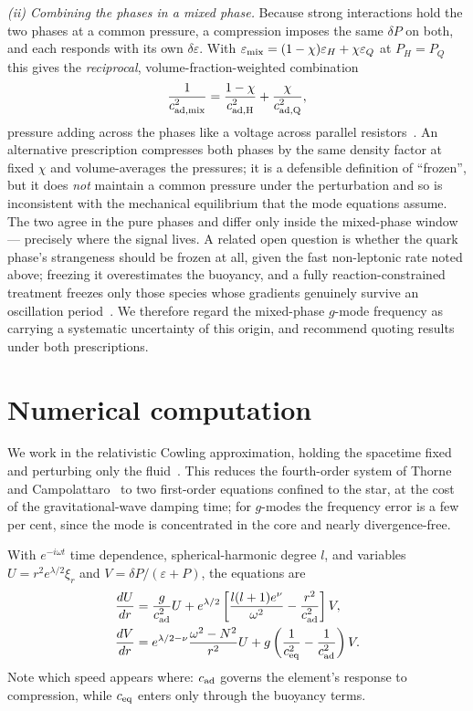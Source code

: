 \documentclass[aps,prd,twocolumn,superscriptaddress,nofootinbib,10pt]{revtex4-2}
\begin{document}
\emph{(ii) Combining the phases in a mixed phase.} Because strong interactions
hold the two phases at a common pressure, a compression imposes the same $\delta
P$ on both, and each responds with its own $\delta\varepsilon$. With
$\varepsilon_{\rm mix}=(1-\chi)\varepsilon_{H}+\chi\varepsilon_{Q}$ at
$P_{H}=P_{Q}$ this gives the \emph{reciprocal}, volume-fraction-weighted
combination
\begin{equation}
  \frac{1}{c_{\rm ad,mix}^{2}} = \frac{1-\chi}{c_{\rm ad,H}^{2}}
                               + \frac{\chi}{c_{\rm ad,Q}^{2}},
  \label{eq:isobaric}
\end{equation}
pressure adding across the phases like a voltage across parallel
resistors~\cite{Jaikumar2021}. An alternative prescription compresses both
phases by the same density factor at fixed $\chi$ and volume-averages the
pressures; it is a defensible definition of ``frozen'', but it does \emph{not}
maintain a common pressure under the perturbation and so is inconsistent with
the mechanical equilibrium that the mode equations assume. The two agree in the
pure phases and differ only inside the mixed-phase window --- precisely where
the signal lives. A related open question is whether the quark phase's
strangeness should be frozen at all, given the fast non-leptonic rate noted
above; freezing it overestimates the buoyancy, and a fully
reaction-constrained treatment freezes only those species whose gradients
genuinely survive an oscillation period~\cite{Haskell2024}. We therefore regard
the mixed-phase $g$-mode frequency as carrying a systematic uncertainty of this
origin, and recommend quoting results under both prescriptions.

\section{Numerical computation}

We work in the relativistic Cowling approximation, holding the spacetime fixed
and perturbing only the fluid~\cite{McDermott1983}. This reduces the
fourth-order system of Thorne and Campolattaro~\cite{ThorneCampolattaro1967} to
two first-order equations confined to the star, at the cost of the
gravitational-wave damping time; for $g$-modes the frequency error is a few per
cent, since the mode is concentrated in the core and nearly divergence-free.

With $e^{-i\omega t}$ time dependence, spherical-harmonic degree $l$, and
variables $U=r^{2}e^{\lambda/2}\xi_{r}$ and $V=\delta P/(\varepsilon+P)$, the
equations are~\cite{Jaikumar2021}
\begin{align}
  \frac{dU}{dr} &= \frac{g}{c_{\rm ad}^{2}}U
    + e^{\lambda/2}\left[\frac{l(l+1)e^{\nu}}{\omega^{2}}
      - \frac{r^{2}}{c_{\rm ad}^{2}}\right]V, \nonumber\\
  \frac{dV}{dr} &= e^{\lambda/2-\nu}\frac{\omega^{2}-N^{2}}{r^{2}}U
    + g\left(\frac{1}{c_{\rm eq}^{2}}-\frac{1}{c_{\rm ad}^{2}}\right)V.
  \label{eq:cowling}
\end{align}
Note which speed appears where: $c_{\rm ad}$ governs the element's response to
compression, while $c_{\rm eq}$ enters only through the buoyancy terms.
\end{document}
